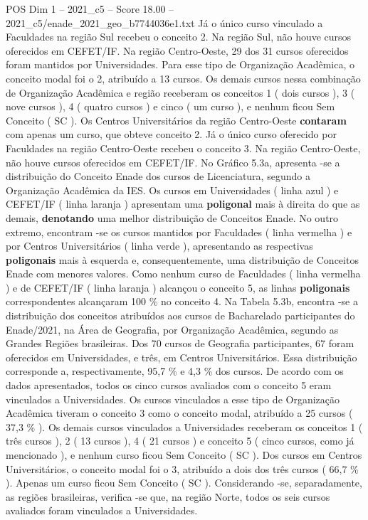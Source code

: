 \begin{textsample}{POS Dim 1 – 2021\_c5 – Score 18.00 – 2021\_c5/enade\_2021\_geo\_b7744036e1.txt}
Já o único curso vinculado a Faculdades na região Sul recebeu o conceito 2.
Na região Sul, não houve cursos oferecidos em CEFET/IF.
Na região Centro-Oeste, 29 dos 31 cursos oferecidos foram mantidos por Universidades.
Para esse tipo de Organização Acadêmica, o conceito modal foi o 2, atribuído a 13 cursos.
Os demais cursos nessa combinação de Organização Acadêmica e região receberam os conceitos 1 ( dois cursos ), 3 ( nove cursos ), 4 ( quatro cursos ) e cinco ( um curso ), e nenhum ficou Sem Conceito ( SC ).
Os Centros Universitários da região Centro-Oeste \textbf{contaram} com apenas um curso, que obteve conceito 2.
Já o único curso oferecido por Faculdades na região Centro-Oeste recebeu o conceito 3.
Na região Centro-Oeste, não houve cursos oferecidos em CEFET/IF.
No Gráfico 5.3a, apresenta -se a distribuição do Conceito Enade dos cursos de Licenciatura, segundo a Organização Acadêmica da IES.
Os cursos em Universidades ( linha azul ) e CEFET/IF ( linha laranja ) apresentam uma \textbf{poligonal} mais à direita do que as demais, \textbf{denotando} uma melhor distribuição de Conceitos Enade.
No outro extremo, encontram -se os cursos mantidos por Faculdades ( linha vermelha ) e por Centros Universitários ( linha verde ), apresentando as respectivas \textbf{poligonais} mais à esquerda e, consequentemente, uma distribuição de Conceitos Enade com menores valores.
Como nenhum curso de Faculdades ( linha vermelha ) e de CEFET/IF ( linha laranja ) alcançou o conceito 5, as linhas \textbf{poligonais} correspondentes alcançaram 100 \% no conceito 4.
Na Tabela 5.3b, encontra -se a distribuição dos conceitos atribuídos aos cursos de Bacharelado participantes do Enade/2021, na Área de Geografia, por Organização Acadêmica, segundo as Grandes Regiões brasileiras.
Dos 70 cursos de Geografia participantes, 67 foram oferecidos em Universidades, e três, em Centros Universitários.
Essa distribuição corresponde a, respectivamente, 95,7 \% e 4,3 \% dos cursos.
De acordo com os dados apresentados, todos os cinco cursos avaliados com o conceito 5 eram vinculados a Universidades.
Os cursos vinculados a esse tipo de Organização Acadêmica tiveram o conceito 3 como o conceito modal, atribuído a 25 cursos ( 37,3 \% ).
Os demais cursos vinculados a Universidades receberam os conceitos 1 ( três cursos ), 2 ( 13 cursos ), 4 ( 21 cursos ) e conceito 5 ( cinco cursos, como já mencionado ), e nenhum curso ficou Sem Conceito ( SC ).
Dos cursos em Centros Universitários, o conceito modal foi o 3, atribuído a dois dos três cursos ( 66,7 \% ).
Apenas um curso ficou Sem Conceito ( SC ).
Considerando -se, separadamente, as regiões brasileiras, verifica -se que, na região Norte, todos os seis cursos avaliados foram vinculados a Universidades.

\end{textsample}
